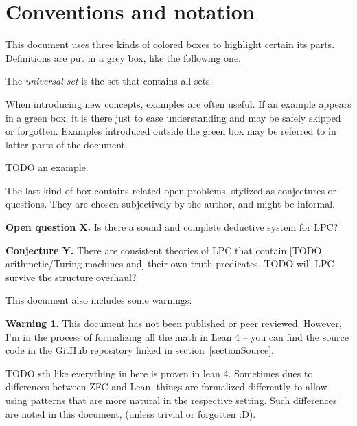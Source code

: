 \documentclass[oneside,12pt]{book}
\newcounter{question}
\theoremstyle{definition}
\newtheorem*{warning}{Warning}
\theoremstyle{remark}
\begin{document}
\section{Conventions and notation}

This document uses three kinds of colored boxes to highlight certain its parts.
Definitions are put in a grey box, like the following one.

\medskip \begin{defBox}
  The \textit{universal set} is the set that contains all sets.
\end{defBox}

When introducing new concepts, examples are often useful. If an example
appears in a green box, it is there just to ease understanding and may be
safely skipped or forgotten. Examples introduced outside the green box
may be referred to in latter parts of the document.

\begin{exampleBox}
  TODO an example.
\end{exampleBox}

The last kind of box contains related open problems, stylized as conjectures
or questions. They are chosen subjectively by the author, and might be informal.

\begin{questionBox}
  \textbf{\color{black}Open question X.} Is there a sound and complete deductive
  system for LPC?
  
  \medskip \noindent
  \textbf{\color{black}Conjecture Y.} There are consistent theories of LPC that
  contain [TODO arithmetic/Turing machines and] their own truth predicates.
  TODO will LPC survive the structure overhaul?
\end{questionBox}

This document also includes some warnings:

\begin{warning}
  This document has not been published or peer reviewed. However, I'm in the process
  of formalizing all the math in Lean 4 -- you can find the source code in the
  GitHub repository linked in section~\ref{sectionSource}.
  
  TODO sth like everything in here is proven in lean 4. Sometimes dues to
  differences between ZFC and Lean, things are formalized differently
  to allow using patterns that are more natural in the respective setting.
  Such differences are noted in this document, (unless trivial or forgotten :D).
\end{warning}
\end{document}
